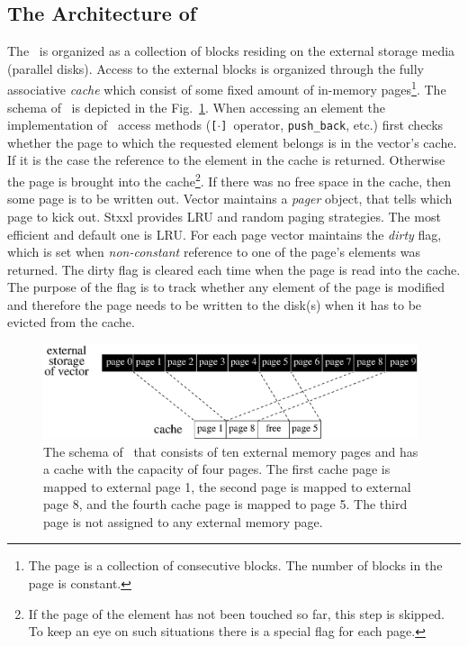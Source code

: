 \documentclass[twoside]{book}
\newcommand{\stxxl}{{\sc Stxxl} }
\begin{document}
\subsection{The Architecture of \xvector}
The \xvector\ is organized as a collection of blocks residing on the
external storage media (parallel disks). Access to the external blocks
is organized through the fully associative \emph{cache} which consist of some
fixed amount of in-memory pages\footnote{The page is a collection of
consecutive blocks. The number of blocks in the page is
constant.}. The schema of 
\xvector\ is depicted 
in the Fig.~\ref{xvectorschema}. When accessing an element the
implementation of \xvector\ access methods (\texttt{[$\cdot$]}~operator,
\texttt{push\_back}, etc.) first checks
whether the page to which the requested element belongs is in the
vector's cache. If it is the case the reference to the
element in the cache is returned. Otherwise the page is brought into the
cache\footnote{If the page of the element has not been touched so 
far, this step is skipped. To keep an eye on such situations there is a
special flag 
for each page.}. If there was no free space in the cache, then some
page is to be written out. Vector maintains a \emph{pager} object, that
tells which page to kick out. \stxxl provides LRU and random paging
strategies. The most efficient and default one is LRU. For each page
vector maintains the \emph{dirty} flag, which is set when
\emph{non-constant} reference to one of the page's elements was
returned. The dirty flag 
is cleared each time when the page is read into the cache. The purpose of the
flag is to track whether any element of the page is modified and
therefore the page needs to
be written to the disk(s) when it has to be evicted from the
cache. 

\begin{figure}[hb]
\begin{center}
\includegraphics[width=11cm]{vector.eps}
\end{center}
\vspace*{-0.3cm}
\caption{\label{xvectorschema} The schema of \xvector\ that consists
of ten external memory pages and has a cache with the capacity of four
pages. The 
first cache page is mapped to external page 1, the second page
is mapped to external page 8, and the fourth cache page is
mapped to page 5. The third page is not assigned to any external
memory page. }
\end{figure}
\end{document}
